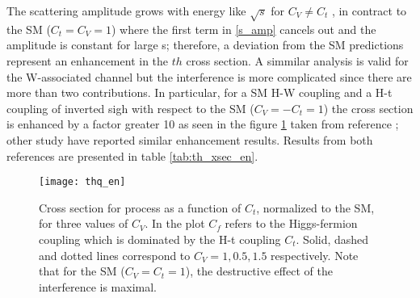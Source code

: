 \noindent The scattering amplitude grows with energy like $\sqrt{s}$ for $C_V \neq C_t$ , in contract to the SM ($C_t=C_V=1$) where the first term in \ref{s_amp} cancels out and the amplitude is constant for large s; therefore, a deviation from the SM predictions represent an enhancement in the $th$ cross section. A simmilar analysis is valid for the W-associated channel but the interference is more complicated since there are more than two contributions. In particular, for a SM H-W coupling and a H-t coupling of inverted sigh with respect to the SM ($C_V =-C_t=1$) the \tHq cross section is enhanced by a factor greater 10 as seen in the figure \ref{thq_en} taken from reference \cite{farina}; other study have reported similar enhancement results\cite{biswas2}. Results from both references are presented in table \ref{tab:th_xsec_en}.

\begin{figure}[h!]
\centering
\texttt{[image: thq\_en]}\\
\caption[Cross section for tHq process as a function of $C_t$]{Cross section for \tHq process as a function of $C_t$, normalized to the SM, for three values of $C_V$. In the plot $C_f$ refers to the Higgs-fermion coupling which is dominated by the H-t coupling $C_t$. Solid, dashed and dotted lines correspond to $C_V= 1, 0.5, 1.5$ respectively. Note that for the SM ($C_V=C_t=1$), the destructive effect of the interference is maximal.} 
\label{thq_en}
\end{figure}


